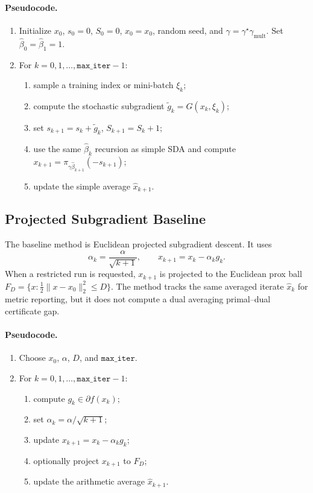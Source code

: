 \documentclass[11pt]{article}
\begin{document}
\paragraph{Pseudocode.}
\begin{enumerate}
    \item Initialize \(x_0\), \(s_0=0\), \(S_0=0\), \(\hat x_0=x_0\), random
    seed, and \(\gamma=\gamma^\star\gamma_{\mathrm{mult}}\).  Set
    \(\hat\beta_0=\hat\beta_1=1\).
    \item For \(k=0,1,\ldots,\texttt{max\_iter}-1\):
    \begin{enumerate}
        \item sample a training index or mini-batch \(\xi_k\);
        \item compute the stochastic subgradient \(\tilde g_k=G(x_k,\xi_k)\);
        \item set \(s_{k+1}=s_k+\tilde g_k\), \(S_{k+1}=S_k+1\);
        \item use the same \(\hat\beta_k\) recursion as simple SDA and compute
        \(x_{k+1}=\pi_{\gamma\hat\beta_{k+1}}(-s_{k+1})\);
        \item update the simple average \(\hat x_{k+1}\).
    \end{enumerate}
\end{enumerate}

\subsection{Projected Subgradient Baseline}

The baseline method is Euclidean projected subgradient descent.  It uses
\[
    \alpha_k=\frac{\alpha}{\sqrt{k+1}},
    \qquad
    x_{k+1}=x_k-\alpha_k g_k.
\]
When a restricted run is requested, \(x_{k+1}\) is projected to the Euclidean
prox ball \(F_D=\{x:\frac12\|x-x_0\|_2^2\le D\}\).  The method tracks the same
averaged iterate \(\hat x_k\) for metric reporting, but it does not compute a
dual averaging primal--dual certificate gap.

\paragraph{Pseudocode.}
\begin{enumerate}
    \item Choose \(x_0\), \(\alpha\), \(D\), and \(\texttt{max\_iter}\).
    \item For \(k=0,1,\ldots,\texttt{max\_iter}-1\):
    \begin{enumerate}
        \item compute \(g_k\in\partial f(x_k)\);
        \item set \(\alpha_k=\alpha/\sqrt{k+1}\);
        \item update \(x_{k+1}=x_k-\alpha_k g_k\);
        \item optionally project \(x_{k+1}\) to \(F_D\);
        \item update the arithmetic average \(\hat x_{k+1}\).
    \end{enumerate}
\end{enumerate}
\end{document}
